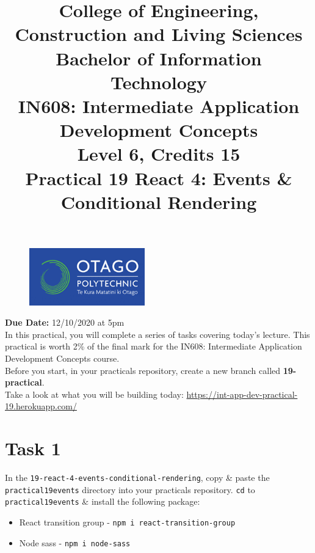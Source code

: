 \documentclass{article}
\author{}
\begin{document}
\begin{figure}
	\centering
	\includegraphics[width=50mm]{./img/logo.png}
\end{figure}

\title{College of Engineering, Construction and Living Sciences\\Bachelor of Information Technology\\IN608: Intermediate Application Development Concepts\\Level 6, Credits 15\\\textbf{Practical 19 React 4: Events \& Conditional Rendering}} 
\date{}
\maketitle

\textbf{Due Date:} 12/10/2020 at 5pm \\

In this practical, you will complete a series of tasks covering today's lecture. This practical is worth 2\% of the final mark for the IN608: Intermediate Application Development Concepts course. \\

Before you start, in your practicals repository, create a new branch called \textbf{19-practical}. \\

Take a look at what you will be building today: \href{https://int-app-dev-practical-19.herokuapp.com/}{https://int-app-dev-practical-19.herokuapp.com/} 

\section*{Task 1} 
In the \texttt{19-react-4-events-conditional-rendering}, copy \& paste the \texttt{practical19events} directory into your practicals repository. \texttt{cd} to \texttt{practical19events} \& install the following package:
\begin{itemize}
  \item React transition group - \texttt{npm i react-transition-group} 
  \item Node sass - \texttt{npm i node-sass}
\end{itemize}
\end{document}
